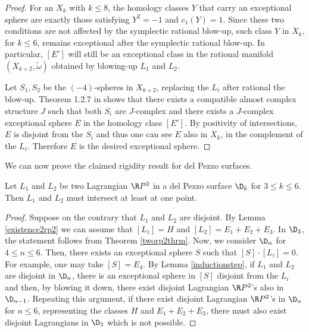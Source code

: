 \begin{proof}
For an $X_{k}$ with $k\leq 8$, the homology classes $Y$ that carry an exceptional sphere are exactly those satisfying $Y^2=-1$ and $c_1(Y)=1$. Since these two conditions are not affected by the symplectic rational blow-up, such class $Y$ in $X_k$, for $k\leq 6$, remains exceptional after the symplectic rational blow-up. In particular, $[E']$ will still be an exceptional class in the rational manifold $(X_{k+2},\tilde{\omega})$ obtained by blowing-up $L_1$ and $L_2$.\par 

Let $S_1,S_2$ be the $(-4)$-spheres in $X_{k+2}$, replacing the $L_i$ after rational the blow-up. Theorem 1.2.7 in \cite{McDOp} shows that there exists a compatible almost complex structure $J$ such that both $S_i$ are $J$-complex and there exists a $J$-complex exceptional sphere $E$ in the homology class $[E']$. By positivity of intersections, $E$ is disjoint from the $S_i$ and thus one can see $E$ also in $X_k$, in the complement of the $L_i$. Therefore $E$ is the desired exceptional sphere.
\end{proof}





We can now prove the claimed rigidity result for del Pezzo surfaces.

\begin{Theorem}\label{delpezzothrm}
Let $L_1$ and $L_2$ be two Lagrangian $\R P^2$ in a del Pezzo surface $\D_k$ for $3\leq k \leq 6$. Then $L_1$ and $L_2$ must intersect at least at one point.
\end{Theorem}

\begin{proof}

Suppose on the contrary that $L_1$ and $L_2$ are disjoint. By Lemma \ref{existence2rp2} we can assume that $[L_1]=H$ and $[L_2]=E_1+E_2+E_3$. In $\D_3$, the statement follows from Theorem \ref{tworp2thrm}. Now, we consider $\D_n$ for $4\leq n \leq 6$. Then, there exists an exceptional sphere $S$ such that  $[S]\cdot [L_i]=0$. For example, one may take $[S]=E_4$. By Lemma \ref{inductionstep}, if $L_1$ and $L_2$ are disjoint in $\D_n$, there is an exceptional sphere in $[S]$ disjoint from the $L_i$ and then, by blowing it down, there exist disjoint Lagrangian $\R P^2$'s also in $\D_{n-1}$. Repeating this argument, if there exist disjoint Lagrangian $\R P^2$'s in $\D_n$ for $n\leq 6$, representing the classes $H$ and $E_1+E_2+E_3$, there must also exist disjoint Lagrangians in $\D_3$ which is not possible.

\end{proof}


